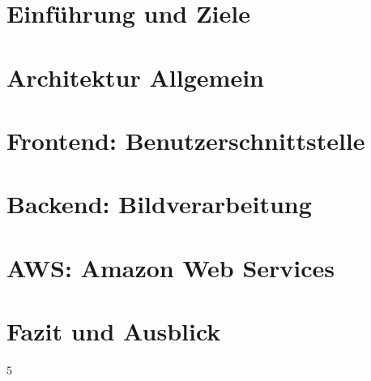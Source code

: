 
\begin{abstract}
	
\end{abstract}


\section{Einführung und Ziele}


\section{Architektur Allgemein}


\section{Frontend: Benutzerschnittstelle}


\section{Backend: Bildverarbeitung}


\section{AWS: Amazon Web Services}


\section{Fazit und Ausblick}
5 